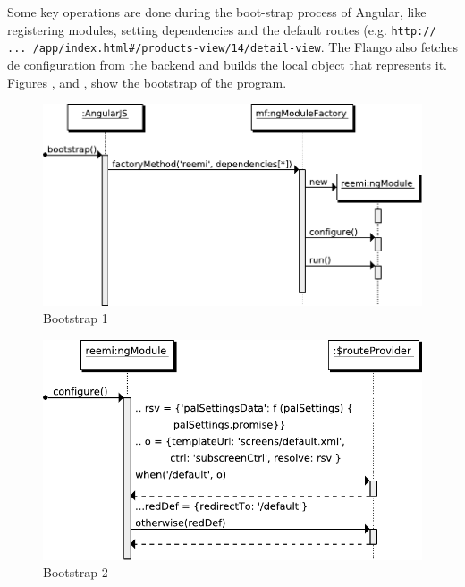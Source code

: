 Some key operations are done during the boot-strap process of Angular, like registering modules, setting dependencies and the default routes (e.g. \texttt{http:// ... /app/index.html\#/products-view/14/detail-view}.
The Flango \cm also fetches de configuration from the backend and builds the local object that represents it.
Figures ,  and , show the bootstrap of the program.

\begin{figure}[htb]
    \centering
    \includegraphics{figures/design/seqdia/bootstrap-1.pdf}
    \caption{Bootstrap 1}
    \label{fig:design-seqdia-bootstrap-1}
\end{figure}

\begin{figure}[htb]
    \centering
    \includegraphics{figures/design/seqdia/bootstrap-2.pdf}
    \caption{Bootstrap 2}
    \label{fig:design-seqdia-bootstrap-2}
\end{figure}

